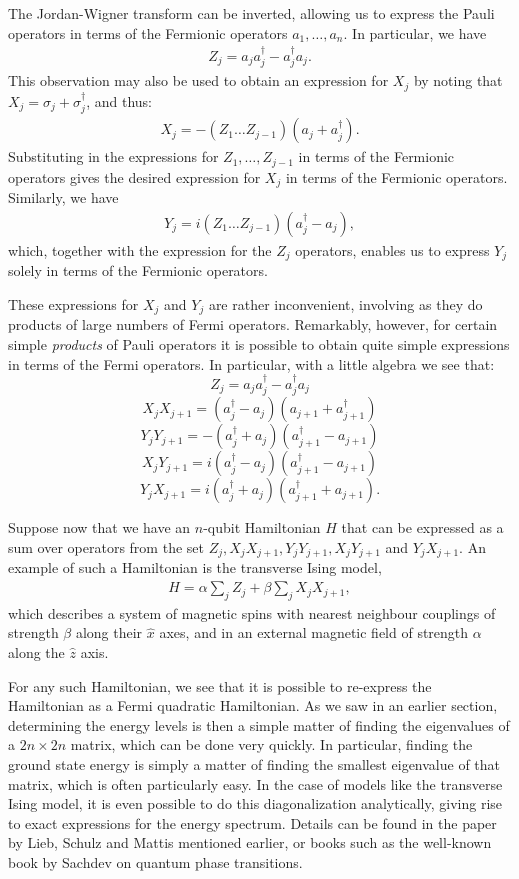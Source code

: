 \documentclass[12pt]{article}
\begin{document}
{The Jordan-Wigner transform can be inverted, allowing us to express
the Pauli operators in terms of the Fermionic operators
$a_1,\ldots,a_n$.  In particular, we have
\begin{eqnarray}
  Z_j = a_ja_j^\dagger-a_j^\dagger a_j.
\end{eqnarray}
This observation may also be used to obtain an expression for $X_j$ by
noting that $X_j = \sigma_j +\sigma_j^\dagger$, and thus:
\begin{eqnarray}
  X_j = -(Z_1 \ldots Z_{j-1}) (a_j+a_j^\dagger).
\end{eqnarray}
Substituting in the expressions for $Z_1,\ldots,Z_{j-1}$ in terms of
the Fermionic operators gives the desired expression for $X_j$ in
terms of the Fermionic operators.  Similarly, we have
\begin{eqnarray}
  Y_j = i (Z_1 \ldots Z_{j-1}) (a_{j}^\dagger-a_{j}),
\end{eqnarray}
which, together with the expression for the $Z_j$ operators, enables
us to express $Y_j$ solely in terms of the Fermionic operators.

These expressions for $X_j$ and $Y_j$ are rather inconvenient,
involving as they do products of large numbers of Fermi operators.
Remarkably, however, for certain simple \emph{products} of Pauli
operators it is possible to obtain quite simple expressions in terms
of the Fermi operators.  In particular, with a little algebra we see
that:
$$
  Z_j = a_ja_j^\dagger - a_j^\dagger a_j
$$
$$
  X_jX_{j+1} = (a_j^\dagger-a_j)(a_{j+1}+a_{j+1}^\dagger )
$$
$$
  Y_jY_{j+1} = -(a_j^\dagger+a_j)(a_{j+1}^\dagger-a_{j+1})
$$
$$
  X_jY_{j+1} =  i(a_j^\dagger-a_j) (a_{j+1}^\dagger-a_{j+1})
$$
$$
  Y_jX_{j+1} = i(a_j^\dagger+a_j) (a_{j+1}^\dagger+a_{j+1}).
$$

Suppose now that we have an $n$-qubit Hamiltonian $H$ that can be
expressed as a sum over operators from the set $Z_j,
X_jX_{j+1},Y_jY_{j+1},X_jY_{j+1}$ and $Y_{j}X_{j+1}$.  An example of
such a Hamiltonian is the transverse Ising model,
\begin{eqnarray}
  H = \alpha \sum_j Z_j + \beta \sum_j X_j X_{j+1},
\end{eqnarray}
which describes a system of magnetic spins with nearest neighbour
couplings of strength $\beta$ along their $\hat x$ axes, and in an
external magnetic field of strength $\alpha$ along the $\hat z$ axis.

For any such Hamiltonian, we see that it is possible to re-express the
Hamiltonian as a Fermi quadratic Hamiltonian.  As we saw in an earlier
section, determining the energy levels is then a simple matter of
finding the eigenvalues of a $2n \times 2n$ matrix, which can be done
very quickly. In particular, finding the ground state energy is simply
a matter of finding the smallest eigenvalue of that matrix, which is
often particularly easy.  In the case of models like the transverse
Ising model, it is even possible to do this diagonalization
analytically, giving rise to exact expressions for the energy
spectrum.  Details can be found in the paper by Lieb, Schulz and
Mattis mentioned earlier, or books such as the well-known book by
Sachdev on quantum phase transitions.

}
\end{document}
